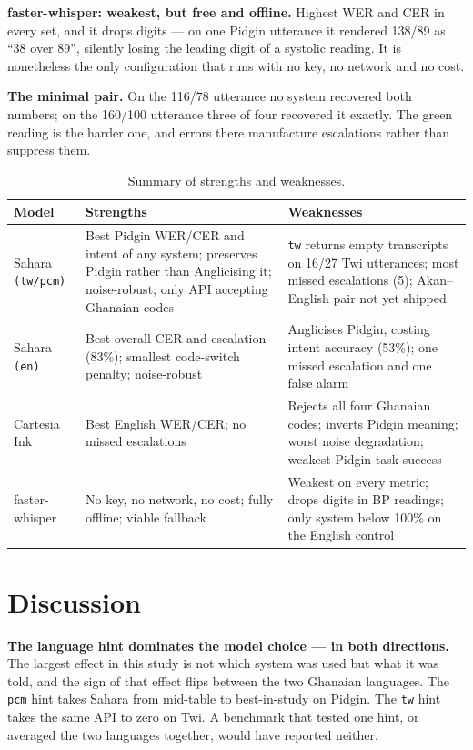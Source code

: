 \documentclass[a4paper,10pt,twocolumn]{article}
\begin{document}
\textbf{faster-whisper: weakest, but free and offline.} Highest WER and CER in
every set, and it drops digits --- on one Pidgin utterance it rendered 138/89 as
``38 over 89'', silently losing the leading digit of a systolic reading. It is
nonetheless the only configuration that runs with no key, no network and no cost.

\textbf{The minimal pair.} On the 116/78 utterance no system recovered both
numbers; on the 160/100 utterance three of four recovered it exactly. The green
reading is the harder one, and errors there manufacture escalations rather than
suppress them.

\begin{table}[t]
\centering\small
\caption{Summary of strengths and weaknesses.}
\label{tab:proscon}
\setlength{\tabcolsep}{3pt}
\renewcommand{\arraystretch}{1.12}
\begin{tabular}{@{}p{1.5cm}p{2.55cm}p{2.55cm}@{}}
\toprule
Model & Strengths & Weaknesses \\
\midrule
Sahara \texttt{(tw/pcm)} &
Best Pidgin WER/CER and intent of any system; preserves Pidgin rather than
Anglicising it; noise-robust; only API accepting Ghanaian codes &
\texttt{tw} returns empty transcripts on 16/27 Twi utterances; most missed
escalations (5); Akan--English pair not yet shipped \\
\addlinespace
Sahara \texttt{(en)} &
Best overall CER and escalation (83\%); smallest code-switch penalty;
noise-robust &
Anglicises Pidgin, costing intent accuracy (53\%); one missed escalation and one
false alarm \\
\addlinespace
Cartesia Ink &
Best English WER/CER; no missed escalations &
Rejects all four Ghanaian codes; inverts Pidgin meaning; worst noise
degradation; weakest Pidgin task success \\
\addlinespace
faster-whisper &
No key, no network, no cost; fully offline; viable fallback &
Weakest on every metric; drops digits in BP readings; only system below 100\% on
the English control \\
\bottomrule
\end{tabular}
\end{table}

\section{Discussion}

\textbf{The language hint dominates the model choice --- in both directions.} The
largest effect in this study is not which system was used but what it was told,
and the sign of that effect flips between the two Ghanaian languages. The
\texttt{pcm} hint takes Sahara from mid-table to best-in-study on Pidgin. The
\texttt{tw} hint takes the same API to zero on Twi. A benchmark that tested one
hint, or averaged the two languages together, would have reported neither.
\end{document}
